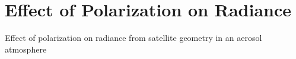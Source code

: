 \section{Effect of Polarization on Radiance}

Effect of polarization on radiance from satellite geometry in an aerosol atmosphere 